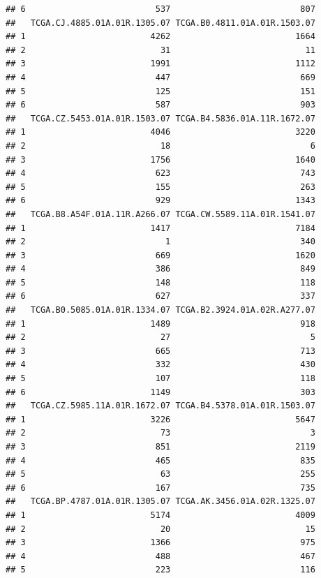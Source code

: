 \documentclass[
]{article}
\begin{document}
\begin{verbatim}
## 6                          537                          807
##   TCGA.CJ.4885.01A.01R.1305.07 TCGA.B0.4811.01A.01R.1503.07
## 1                         4262                         1664
## 2                           31                           11
## 3                         1991                         1112
## 4                          447                          669
## 5                          125                          151
## 6                          587                          903
##   TCGA.CZ.5453.01A.01R.1503.07 TCGA.B4.5836.01A.11R.1672.07
## 1                         4046                         3220
## 2                           18                            6
## 3                         1756                         1640
## 4                          623                          743
## 5                          155                          263
## 6                          929                         1343
##   TCGA.B8.A54F.01A.11R.A266.07 TCGA.CW.5589.11A.01R.1541.07
## 1                         1417                         7184
## 2                            1                          340
## 3                          669                         1620
## 4                          386                          849
## 5                          148                          118
## 6                          627                          337
##   TCGA.B0.5085.01A.01R.1334.07 TCGA.B2.3924.01A.02R.A277.07
## 1                         1489                          918
## 2                           27                            5
## 3                          665                          713
## 4                          332                          430
## 5                          107                          118
## 6                         1149                          303
##   TCGA.CZ.5985.11A.01R.1672.07 TCGA.B4.5378.01A.01R.1503.07
## 1                         3226                         5647
## 2                           73                            3
## 3                          851                         2119
## 4                          465                          835
## 5                           63                          255
## 6                          167                          735
##   TCGA.BP.4787.01A.01R.1305.07 TCGA.AK.3456.01A.02R.1325.07
## 1                         5174                         4009
## 2                           20                           15
## 3                         1366                          975
## 4                          488                          467
## 5                          223                          116

\end{verbatim}
\end{document}
